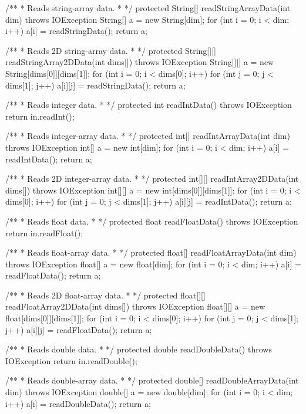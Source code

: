 \begin{code}
\begin{hide}
{   /**
    * Reads string-array data.
    *
    */
   protected String[] readStringArrayData(int dim) throws IOException {
      String[] a = new String[dim];
      for (int i = 0; i < dim; i++)
         a[i] = readStringData();
      return a;
   }

   /**
    * Reads 2D string-array data.
    *
    */
   protected String[][] readStringArray2DData(int dims[]) throws IOException {
      String[][] a = new String[dims[0]][dims[1]];
      for (int i = 0; i < dims[0]; i++)
         for (int j = 0; j < dims[1]; j++)
            a[i][j] = readStringData();
      return a;
   }


   /**
    * Reads integer data.
    *
    */
   protected int readIntData() throws IOException {
      return in.readInt();
   }

   /**
    * Reads integer-array data.
    *
    */
   protected int[] readIntArrayData(int dim) throws IOException {
      int[] a = new int[dim];
      for (int i = 0; i < dim; i++)
         a[i] = readIntData();
      return a;
   }

   /**
    * Reads 2D integer-array data.
    *
    */
   protected int[][] readIntArray2DData(int dims[]) throws IOException {
      int[][] a = new int[dims[0]][dims[1]];
      for (int i = 0; i < dims[0]; i++)
         for (int j = 0; j < dims[1]; j++)
            a[i][j] = readIntData();
      return a;
   }


   /**
    * Reads float data.
    *
    */
   protected float readFloatData() throws IOException {
      return in.readFloat();
   }

   /**
    * Reads float-array data.
    *
    */
   protected float[] readFloatArrayData(int dim) throws IOException {
      float[] a = new float[dim];
      for (int i = 0; i < dim; i++)
         a[i] = readFloatData();
      return a;
   }

   /**
    * Reads 2D float-array data.
    *
    */
   protected float[][] readFloatArray2DData(int dims[]) throws IOException {
      float[][] a = new float[dims[0]][dims[1]];
      for (int i = 0; i < dims[0]; i++)
         for (int j = 0; j < dims[1]; j++)
            a[i][j] = readFloatData();
      return a;
   }


   /**
    * Reads double data.
    *
    */
   protected double readDoubleData() throws IOException {
      return in.readDouble();
   }

   /**
    * Reads double-array data.
    *
    */
   protected double[] readDoubleArrayData(int dim) throws IOException {
      double[] a = new double[dim];
      for (int i = 0; i < dim; i++)
         a[i] = readDoubleData();
      return a;
   }

}
\end{hide}
\end{code}
